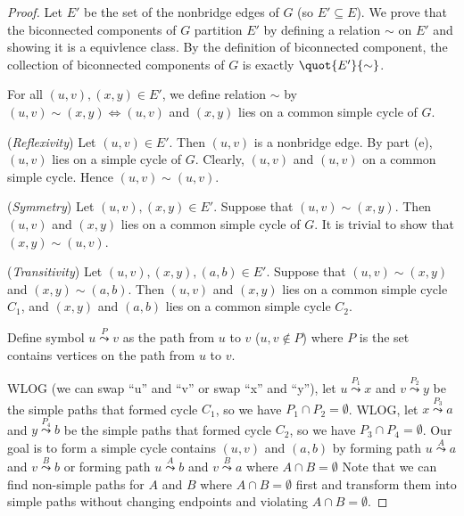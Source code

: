 \begin{proof}
    Let $E'$ be the set of the nonbridge edges of $G$ (so $E' \subseteq E$).
    We prove that the biconnected components of $G$ partition $E'$
    by defining a relation $\sim$ on $E'$ and showing it is a equivlence class.
    By the definition of biconnected component,
    the collection of biconnected components of $G$
    is exactly $\quot{E'}{\sim}$.

    For all $(u,v), (x,y) \in E'$, we define relation $\sim$ by 
    $(u,v) \sim (x,y) \Longleftrightarrow (u,v)$ and $(x,y)$
    lies on a common simple cycle of $G$.
    
    (\textit{Reflexivity})
    Let $(u,v) \in E'$.
    Then $(u,v)$ is a nonbridge edge.
    By part (e), $(u,v)$ lies on a simple cycle of $G$.
    Clearly, $(u,v)$ and $(u,v)$ on a common simple cycle.
    Hence $(u,v) \sim (u,v)$.

    (\textit{Symmetry})
    Let $(u,v), (x,y) \in E'$.
    Suppose that $(u,v) \sim (x,y)$.
    Then $(u,v)$ and $(x,y)$ lies on a common simple cycle of $G$.
    It is trivial to show that $(x,y) \sim (u,v)$.

    (\textit{Transitivity})
    Let $(u,v), (x,y), (a,b) \in E'$.
    Suppose that $(u,v) \sim (x,y)$ and $(x,y) \sim (a,b)$.
    Then $(u,v)$ and $(x,y)$ lies on a common simple cycle $C_1$,
    and $(x,y)$ and $(a,b)$ lies on a common simple cycle $C_2$.

    Define symbol
    $u \overset{P}{\leadsto} v$
    as the path from $u$ to $v$ ($u,v \notin P$)
    where $P$ is the set contains vertices on the path from $u$ to $v$.

    WLOG (we can swap ``u'' and ``v'' or swap ``x'' and ``y''), 
    let $u \overset{P_1}{\leadsto} x$ 
    and $v \overset{P_2}{\leadsto} y$ be the simple paths
    that formed cycle $C_1$, so we have $P_1 \cap P_2 = \emptyset$.
    WLOG, let $x \overset{P_3}{\leadsto} a$ 
    and $y \overset{P_4}{\leadsto} b$ be the simple paths
    that formed cycle $C_2$, so we have $P_3 \cap P_4 = \emptyset$.
    Our goal is to form a simple cycle contains $(u,v)$ and $(a,b)$
    by forming path $u \overset{A}{\leadsto} a$
    and $v \overset{B}{\leadsto} b$
    or forming path $u \overset{A}{\leadsto} b$
    and $v \overset{B}{\leadsto} a$
    where $A \cap B = \emptyset$
    Note that we can find non-simple paths 
    for $A$ and $B$
    where $A \cap B = \emptyset$ first
    and transform them into simple paths 
    without changing endpoints and 
    violating $A \cap B = \emptyset$.


\end{proof}
